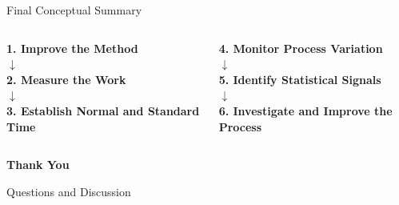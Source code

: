 \documentclass[aspectratio=169,10pt]{beamer}
\begin{document}

\begin{frame}{Final Conceptual Summary}
\small
\begin{columns}[T,onlytextwidth]
\begin{center}
\textbf{1. Improve the Method}\\[3pt]
$\downarrow$\\[3pt]
\textbf{2. Measure the Work}\\[3pt]
$\downarrow$\\[3pt]
\textbf{3. Establish Normal and Standard Time}
\end{center}
\begin{center}
\textbf{4. Monitor Process Variation}\\[3pt]
$\downarrow$\\[3pt]
\textbf{5. Identify Statistical Signals}\\[3pt]
$\downarrow$\\[3pt]
\textbf{6. Investigate and Improve the Process}
\end{center}
\end{columns}
\vspace{6pt}
\begin{center}
\end{center}
\end{frame}


\begin{frame}[standout]
\centering
\Huge
\textbf{Thank You}

\vspace{8pt}

\Large
Questions and Discussion
\end{frame}
\end{document}
